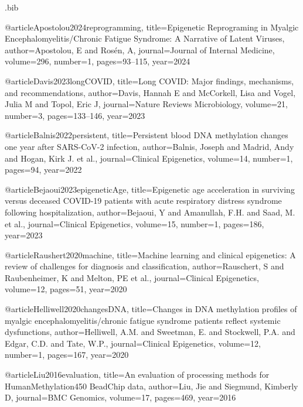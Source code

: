 \documentclass[journal]{IEEEtran}
\begin{document}
\begin{filecontents*}{\jobname.bib}

@article{Apostolou2024reprogramming,
  title={Epigenetic Reprograming in Myalgic Encephalomyelitis/Chronic Fatigue Syndrome: A Narrative of Latent Viruses},
  author={Apostolou, E and Ros{\'e}n, A},
  journal={Journal of Internal Medicine},
  volume={296},
  number={1},
  pages={93--115},
  year={2024}
}

@article{Davis2023longCOVID,
  title={Long COVID: Major findings, mechanisms, and recommendations},
  author={Davis, Hannah E and McCorkell, Lisa and Vogel, Julia M and Topol, Eric J},
  journal={Nature Reviews Microbiology},
  volume={21},
  number={3},
  pages={133--146},
  year={2023}
}

@article{Balnis2022persistent,
  title={Persistent blood DNA methylation changes one year after SARS-CoV-2 infection},
  author={Balnis, Joseph and Madrid, Andy and Hogan, Kirk J. et al.},
  journal={Clinical Epigenetics},
  volume={14},
  number={1},
  pages={94},
  year={2022}
}

@article{Bejaoui2023epigeneticAge,
  title={Epigenetic age acceleration in surviving versus deceased COVID-19 patients with acute respiratory distress syndrome following hospitalization},
  author={Bejaoui, Y and Amanullah, F.H. and Saad, M. et al.},
  journal={Clinical Epigenetics},
  volume={15},
  number={1},
  pages={186},
  year={2023}
}

@article{Raushert2020machine,
  title={Machine learning and clinical epigenetics: A review of challenges for diagnosis and classification},
  author={Rauschert, S and Raubenheimer, K and Melton, PE et al.},
  journal={Clinical Epigenetics},
  volume={12},
  pages={51},
  year={2020}
}

@article{Helliwell2020changesDNA,
  title={Changes in DNA methylation profiles of myalgic encephalomyelitis/chronic fatigue syndrome patients reflect systemic dysfunctions},
  author={Helliwell, A.M. and Sweetman, E. and Stockwell, P.A. and Edgar, C.D. and Tate, W.P.},
  journal={Clinical Epigenetics},
  volume={12},
  number={1},
  pages={167},
  year={2020}
}

@article{Liu2016evaluation,
  title={An evaluation of processing methods for HumanMethylation450 BeadChip data},
  author={Liu, Jie and Siegmund, Kimberly D},
  journal={BMC Genomics},
  volume={17},
  pages={469},
  year={2016}
}

\end{filecontents*}
\end{document}
